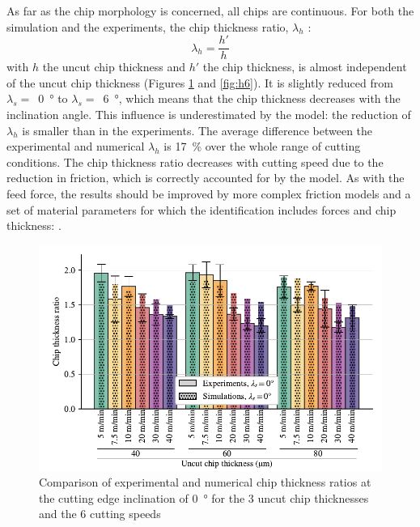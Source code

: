\documentclass[preprint,12pt,times]{elsarticle}
\begin{document}
As far as the chip morphology is concerned, all chips are continuous. For both the simulation and the experiments, the chip thickness ratio, $\lambda_h$ :
%
\begin{equation}
\lambda_h = \frac{h'}{h}
\end{equation}
%
with $h$ the uncut chip thickness and $h'$ the chip thickness, is almost independent of the uncut chip thickness (Figures \ref{fig:h0} and \ref{fig:h6}). It is slightly reduced from $\lambda_s =$~\qty{0}{\degree} to $\lambda_s =$~\qty{6}{\degree}, which means that the chip thickness decreases with the inclination angle. This influence is underestimated by the model: the reduction of $\lambda_h$ is smaller than in the experiments. The average difference between the experimental and numerical $\lambda_h$ is \qty{17}{\%} over the whole range of cutting conditions. The chip thickness ratio decreases with cutting speed due to the reduction in friction, which is correctly accounted for by the model. As with the feed force, the results should be improved by more complex friction models and a set of material parameters for which the identification includes forces and chip thickness: \cite{kugalurpalanisamy_Identification_2022}.

\begin{figure}[!h]
\centering
\includegraphics[width = 140 mm]{Figures/h0}
\caption{Comparison of experimental and numerical chip thickness ratios at the cutting edge inclination of \qty{0}{\degree} for the 3 uncut chip thicknesses and the 6 cutting speeds}
\label{fig:h0}
\end{figure}
\end{document}
